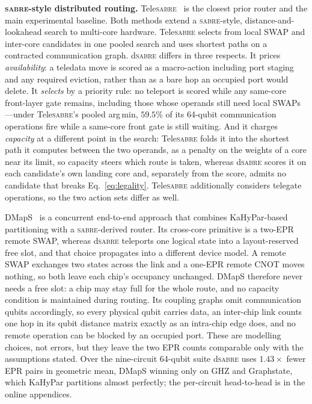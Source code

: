 \documentclass[journal]{IEEEtran}
\newcommand{\dSABRE}{d\textsc{sabre}}
\newcommand{\TeleSABRE}{Tele\textsc{sabre}}
\newcommand{\SABRE}{\textsc{sabre}}
\begin{document}
\textbf{\SABRE{}-style distributed routing.}
\TeleSABRE{}~\cite{russo2025telesabre} is the closest prior router and the
main experimental baseline. Both methods extend a \SABRE{}-style,
distance-and-lookahead search to multi-core hardware. \TeleSABRE{} selects
from local SWAP and inter-core candidates in one pooled search and uses
shortest paths on a contracted communication graph. \dSABRE{} differs in
three respects. It prices \emph{availability}: a teledata move is scored as a
macro-action including port staging and any required eviction, rather than as
a bare hop an occupied port would delete. It \emph{selects} by a priority
rule: no teleport is scored while any same-core front-layer gate remains,
including those whose operands still need local SWAPs---under
\TeleSABRE{}'s pooled arg\,min, $59.5\%$ of its 64-qubit communication
operations fire while a same-core front gate is still waiting. And it charges
\emph{capacity} at a different point in the search: \TeleSABRE{} folds it into
the shortest path it computes between the two operands, as a penalty on the
weights of a core near its limit, so capacity steers which route is taken,
whereas \dSABRE{} scores it on each candidate's own landing core and,
separately from the score, admits no candidate that breaks
Eq.~\eqref{eq:legality}. \TeleSABRE{} additionally considers telegate
operations, so the two action sets differ as well.

DMapS~\cite{luo2025dmaps} is a concurrent end-to-end approach that combines
KaHyPar-based partitioning with a \SABRE{}-derived router. Its cross-core
primitive is a two-EPR remote SWAP, whereas \dSABRE{} teleports one logical
state into a layout-reserved free slot, and that choice propagates into a
different device model. A remote SWAP exchanges two states across the link
and a one-EPR remote CNOT moves nothing, so both leave each chip's occupancy
unchanged. DMapS therefore never needs a free slot: a chip may stay full for
the whole route, and no capacity condition is maintained during
routing. Its coupling graphs omit communication qubits accordingly, so
every physical qubit carries data, an inter-chip link counts one hop in its qubit
distance matrix exactly as an intra-chip edge does, and no remote operation can
be blocked by an occupied port.
These are modelling choices, not errors, but they leave the two EPR counts
comparable only with the assumptions stated. Over the nine-circuit 64-qubit
suite \dSABRE{} uses $1.43\times$ fewer EPR pairs in geometric mean, DMapS
winning only on GHZ and Graphstate, which KaHyPar partitions almost
perfectly; the per-circuit head-to-head is in the online appendices.
\end{document}
